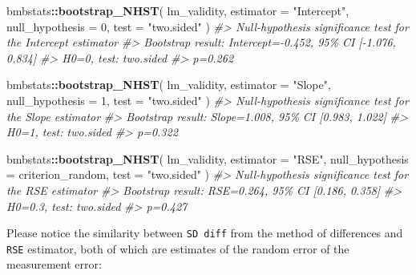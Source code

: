 \documentclass[
]{book}
\newenvironment{Shaded}{\begin{snugshade}}{\end{snugshade}}
\newcommand{\CommentTok}[1]{\textcolor[rgb]{0.56,0.35,0.01}{\textit{#1}}}
\newcommand{\DataTypeTok}[1]{\textcolor[rgb]{0.13,0.29,0.53}{#1}}
\newcommand{\DecValTok}[1]{\textcolor[rgb]{0.00,0.00,0.81}{#1}}
\newcommand{\KeywordTok}[1]{\textcolor[rgb]{0.13,0.29,0.53}{\textbf{#1}}}
\newcommand{\NormalTok}[1]{#1}
\newcommand{\OperatorTok}[1]{\textcolor[rgb]{0.81,0.36,0.00}{\textbf{#1}}}
\newcommand{\StringTok}[1]{\textcolor[rgb]{0.31,0.60,0.02}{#1}}
\begin{document}
\begin{Shaded}
\begin{Highlighting}[]
\NormalTok{bmbstats}\OperatorTok{::}\KeywordTok{bootstrap\_NHST}\NormalTok{(}
\NormalTok{  lm\_validity,}
  \DataTypeTok{estimator =} \StringTok{"Intercept"}\NormalTok{,}
  \DataTypeTok{null\_hypothesis =} \DecValTok{0}\NormalTok{,}
  \DataTypeTok{test =} \StringTok{"two.sided"}
\NormalTok{)}
\CommentTok{\#> Null{-}hypothesis significance test for the \textasciigrave{}Intercept\textasciigrave{} estimator}
\CommentTok{\#> Bootstrap result: Intercept={-}0.452, 95\% CI [{-}1.076, 0.834]}
\CommentTok{\#> H0=0, test: two.sided}
\CommentTok{\#> p=0.262}
\end{Highlighting}
\end{Shaded}

\begin{Shaded}
\begin{Highlighting}[]
\NormalTok{bmbstats}\OperatorTok{::}\KeywordTok{bootstrap\_NHST}\NormalTok{(}
\NormalTok{  lm\_validity,}
  \DataTypeTok{estimator =} \StringTok{"Slope"}\NormalTok{,}
  \DataTypeTok{null\_hypothesis =} \DecValTok{1}\NormalTok{,}
  \DataTypeTok{test =} \StringTok{"two.sided"}
\NormalTok{)}
\CommentTok{\#> Null{-}hypothesis significance test for the \textasciigrave{}Slope\textasciigrave{} estimator}
\CommentTok{\#> Bootstrap result: Slope=1.008, 95\% CI [0.983, 1.022]}
\CommentTok{\#> H0=1, test: two.sided}
\CommentTok{\#> p=0.322}
\end{Highlighting}
\end{Shaded}

\begin{Shaded}
\begin{Highlighting}[]
\NormalTok{bmbstats}\OperatorTok{::}\KeywordTok{bootstrap\_NHST}\NormalTok{(}
\NormalTok{  lm\_validity,}
  \DataTypeTok{estimator =} \StringTok{"RSE"}\NormalTok{,}
  \DataTypeTok{null\_hypothesis =}\NormalTok{ criterion\_random,}
  \DataTypeTok{test =} \StringTok{"two.sided"}
\NormalTok{)}
\CommentTok{\#> Null{-}hypothesis significance test for the \textasciigrave{}RSE\textasciigrave{} estimator}
\CommentTok{\#> Bootstrap result: RSE=0.264, 95\% CI [0.186, 0.358]}
\CommentTok{\#> H0=0.3, test: two.sided}
\CommentTok{\#> p=0.427}
\end{Highlighting}
\end{Shaded}

Please notice the similarity between \texttt{SD\ diff} from the method of differences and \texttt{RSE} estimator, both of which are estimates of the random error of the measurement error:
\end{document}
